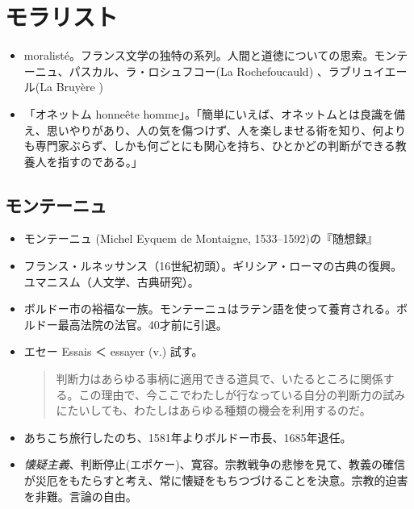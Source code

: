 \documentclass[uplatex,dvipdfmx]{jsarticle}
\begin{document}
\section{モラリスト}

\begin{itemize}
\item moralist{\'e}。フランス文学の独特の系列。人間と道徳についての思索。モンテーニュ、パスカル、ラ・ロシュフコー(La Rochefoucauld) 、ラブリュイエール(La Bruy{\`e}re )

\item 「オネットム honne{\^e}te homme」。「簡単にいえば、オネットムとは良識を備え、思いやりがあり、人の気を傷つけず、人を楽しませる術を知り、何よりも専門家ぶらず、しかも何ごとにも関心を持ち、ひとかどの判断ができる教養人を指すのである。」\citep[p. 36]{前田陽一78:パスカルの人と思想}
\end{itemize}


\subsection{モンテーニュ}

\begin{itemize}
\item モンテーニュ (Michel Eyquem de Montaigne, 1533--1592)の『随想録』
\item フランス・ルネッサンス（16世紀初頭）。ギリシア・ローマの古典の復興。ユマニスム（人文学、古典研究）。

\item ボルドー市の裕福な一族。モンテーニュはラテン語を使って養育される。ボルドー最高法院の法官。40才前に引退。


\item エセー  Essais ＜ essayer (v.) 試す。

  \begin{quote}\small{}
    判断力はあらゆる事柄に適用できる道具で、いたるところに関係する。この理由で、今ここでわたしが行なっている自分の判断力の試みにたいしても、わたしはあらゆる種類の機会を利用するのだ。\citep[p. 189]{モンテーニュ79:エセー}
  \end{quote}

\item あちこち旅行したのち、1581年よりボルドー市長、1685年退任。

\item \emph{懐疑主義}、判断停止(エポケー)、寛容。宗教戦争の悲惨を見て、教義の確信が災厄をもたらすと考え、常に懐疑をもちつづけることを決意。宗教的迫害を非難。言論の自由。


\end{itemize}
\end{document}
